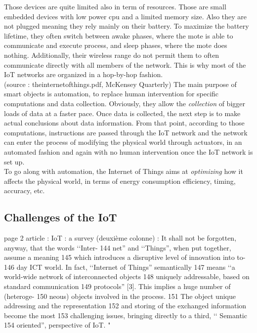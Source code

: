 Those devices are quite limited also in term of resources. Those are small embedded devices with low power cpu and a limited memory size. Also they are not plugged meaning they rely mainly on their battery. To maximize the battery lifetime, they often switch between awake phases, where the mote is able to communicate and execute process, and sleep phases, where the mote does nothing. Additionally, their wireless range do not permit them to often communicate directly with all members of the network. This is why most of the IoT networks are organized in a hop-by-hop fashion. \\

(source : theinternetofthings.pdf, McKensey Quarterly)
The main purpose of smart objects is automation, to replace human intervention for specific computations and data collection. Obviously, they allow the \textit{collection} of bigger loads of data at a faster pace. Once data is collected, the next step is to make actual conclusions about data information. From that point, according to those computations, instructions are passed through the IoT network and the network can enter the process of modifying the physical world through actuators, in an automated fashion and again with no human intervention once the IoT network is set up.\\

To go along with automation, the Internet of Things aims at \textit{optimizing} how it affects the physical world, in terms of energy consumption efficiency, timing, accuracy, etc.

\subsection{Challenges of the IoT}

page 2 article : IoT : a survey (deuxième colonne) :
It shall not be forgotten, anyway, that the words ‘‘Inter-
144
net” and ‘‘Things”, when put together, assume a meaning
145
which introduces a disruptive level of innovation into to-
146
day ICT world. In fact, ‘‘Internet of Things” semantically
147
means ‘‘a world-wide network of interconnected objects
148
uniquely addressable, based on standard communication
149
protocols”
[3]. This implies a huge number of (heteroge-
150
neous) objects involved in the process.
151
The object unique addressing and the representation
152
and storing of the exchanged information become the most
153
challenging issues, bringing directly to a third, ‘‘
Semantic
154
oriented”, perspective of IoT. "
